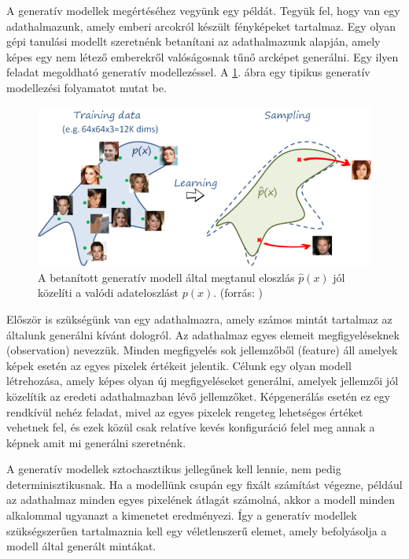 A generatív modellek megértéséhez vegyünk egy példát. Tegyük fel, hogy van egy adathalmazunk, amely emberi arcokról készült fényképeket tartalmaz. Egy olyan gépi tanulási modellt szeretnénk betanítani az adathalmazunk alapján, amely képes egy nem létező emberekről valóságosnak tűnő arcképet generálni. Egy ilyen feladat megoldható generatív modellezéssel. A \ref{fig:generative_model}. ábra egy tipikus generatív modellezési folyamatot mutat be.

\begin{figure}[ht]
	\centering
	\includegraphics[width=0.9\columnwidth]{figures/generative_model_struct.png}
	\caption{A betanított generatív modell által megtanul eloszlás $\hat{p}(x)$ jól közelíti a valódi adateloszlást $p(x)$. (forrás: \cite{fig:generative_model_struct})}
	\label{fig:generative_model}
\end{figure}

Először is szükségünk van egy adathalmazra, amely számos mintát tartalmaz az általunk generálni kívánt dologról. Az adathalmaz egyes elemeit megfigyeléseknek (observation) nevezzük. Minden megfigyelés sok jellemzőből (feature) áll amelyek képek esetén az egyes pixelek értékeit jelentik. Célunk egy olyan modell létrehozása, amely képes olyan új megfigyeléseket generálni, amelyek jellemzői jól közelítik az eredeti adathalmazban lévő jellemzőket. Képgenerálás esetén ez egy rendkívül nehéz feladat, mivel az egyes pixelek rengeteg lehetséges értéket vehetnek fel, és ezek közül csak relatíve kevés konfiguráció felel meg annak a képnek amit mi generálni szeretnénk.

A generatív modellek sztochasztikus jellegűnek kell lennie, nem pedig determinisztikusnak. Ha a modellünk csupán egy fixált számítást végezne, például az adathalmaz minden egyes pixelének átlagát számolná, akkor a modell minden alkalommal ugyanazt a kimenetet eredményezi. Így a generatív modellek szükségszerűen tartalmaznia kell egy véletlenszerű elemet, amely befolyásolja a modell által generált mintákat.

